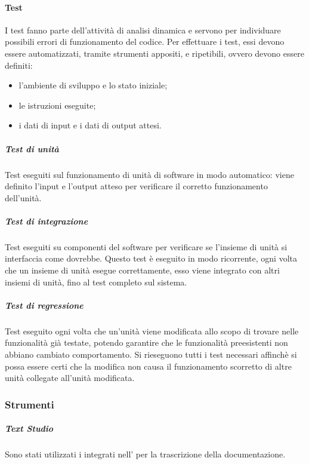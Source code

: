         \paragraph{Test}
			I test fanno parte dell'attività di analisi dinamica e servono per individuare possibili errori di funzionamento del codice. Per effettuare i test, essi devono essere automatizzati, tramite strumenti appositi, e ripetibili, ovvero devono essere definiti:
			\begin{itemize}
				\item l'ambiente di sviluppo e lo stato iniziale;
				\item le istruzioni eseguite;
				\item i dati di input e i dati di output attesi.
			\end{itemize}
            \subparagraph*{Test di unità}
				Test eseguiti sul funzionamento di unità di software in modo automatico: viene definito l'input e l'output atteso per verificare il corretto funzionamento dell'unità.
            \subparagraph*{Test di integrazione}
				Test eseguiti su componenti del software per verificare se l'insieme di unità si interfaccia come dovrebbe. Questo test è eseguito in modo ricorrente, ogni volta che un insieme di unità esegue correttamente, esso viene integrato con altri insiemi di unità, fino al test completo sul sistema.
            \subparagraph*{Test di regressione}
				Test eseguito ogni volta che un'unità viene modificata allo scopo di trovare  nelle funzionalità già testate, potendo garantire che le funzionalità preesistenti non abbiano cambiato comportamento. Si rieseguono tutti i test necessari affinchè si possa essere certi che la modifica non causa il funzionamento scorretto di altre unità collegate all'unità modificata.

    \subsubsection{Strumenti}
        \subparagraph{Text Studio}
	Sono stati utilizzati i  integrati nell'  per la trascrizione della documentazione.